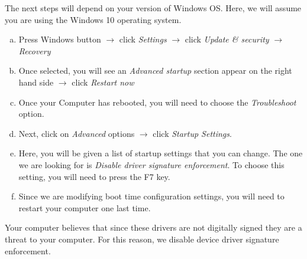 The next steps will depend on your version of Windows OS. Here, we will assume you are using the Windows 10 operating system. %

\begin{enumerate}[a)]
    \item Press Windows button $\to$ click \emph{Settings} $\to$ click \emph{Update \& security} $\to$ \emph{Recovery}
    \item Once selected, you will see an \emph{Advanced startup} section appear on the right hand side $\to$ click \emph{Restart now}
    \item Once your Computer has rebooted, you will need to choose the \emph{Troubleshoot} option.
    \item Next, click on \emph{Advanced} options $\to$ click \emph{Startup Settings}.
    \item Here, you will be given a list of startup settings that you can change. The one we are looking for is \emph{Disable driver signature enforcement}. To choose this setting, you will need to press the F7 key.
    \item Since we are modifying boot time configuration settings, you will need to restart your computer one last time.
\end{enumerate}
Your computer believes that since these drivers are not digitally signed they are a threat to your computer. For this reason, we disable device driver signature enforcement. 


